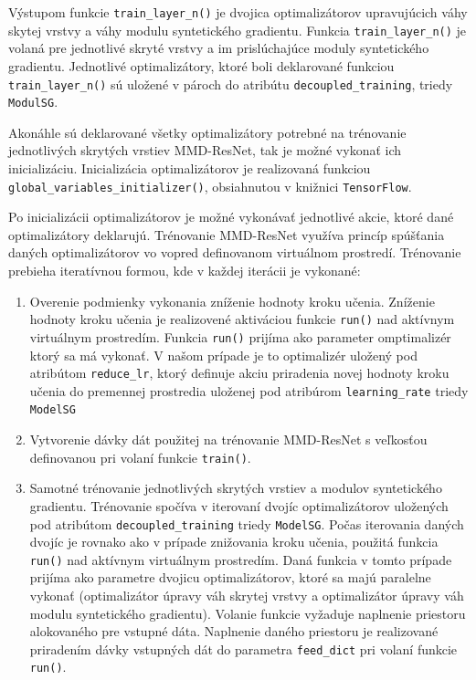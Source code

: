 Výstupom funkcie \texttt{train_layer_n()} je dvojica optimalizátorov upravujúcich váhy skytej vrstvy a váhy modulu syntetického gradientu. Funkcia \texttt{train_layer_n()} je volaná pre jednotlivé skryté vrstvy a im prislúchajúce moduly syntetického gradientu. Jednotlivé optimalizátory, ktoré boli deklarované funkciou \texttt{train_layer_n()} sú uložené v pároch do atribútu \texttt{decoupled_training}, triedy \texttt{ModulSG}. 

Akonáhle sú deklarované všetky optimalizátory potrebné na trénovanie jednotlivých skrytých vrstiev MMD-ResNet, tak je možné vykonať ich inicializáciu. Inicializácia optimalizátorov je realizovaná funkciou \texttt{global_variables_initializer()}, obsiahnutou v knižnici \texttt{TensorFlow}.

Po inicializácii optimalizátorov je možné vykonávať jednotlivé akcie, ktoré dané optimalizátory deklarujú. Trénovanie MMD-ResNet využíva princíp spúšťania daných optimalizátorov vo vopred definovanom virtuálnom prostredí. Trénovanie prebieha iteratívnou formou, kde v každej iterácii je vykonané:
\begin{enumerate}
    \item Overenie podmienky vykonania zníženie hodnoty kroku učenia. Zníženie hodnoty kroku učenia je realizovené aktiváciou funkcie \texttt{run()} nad aktívnym virtuálnym prostredím. Funkcia \texttt{run()} prijíma ako parameter omptimalizér ktorý sa má vykonať. V našom prípade je to optimalizér uložený pod atribútom \texttt{reduce_lr}, ktorý definuje akciu priradenia novej hodnoty kroku učenia do premennej prostredia uloženej pod atribúrom \texttt{learning_rate} triedy \texttt{ModelSG}
    \item Vytvorenie dávky dát použitej na trénovanie MMD-ResNet s veľkosťou definovanou pri volaní funkcie \texttt{train()}.
    \item Samotné trénovanie jednotlivých skrytých vrstiev a modulov syntetického gradientu. Trénovanie spočíva v iterovaní dvojíc optimalizátorov uložených pod atribútom \texttt{decoupled_training} triedy \texttt{ModelSG}. Počas iterovania daných dvojíc je rovnako ako v prípade znižovania kroku učenia, použitá funkcia \texttt{run()} nad aktívnym virtuálnym prostredím. Daná funkcia v tomto prípade prijíma ako parametre dvojicu optimalizátorov, ktoré sa majú paralelne vykonať (optimalizátor úpravy váh skrytej vrstvy a optimalizátor úpravy váh modulu syntetického gradientu). Volanie funkcie vyžaduje naplnenie priestoru alokovaného pre vstupné dáta. Naplnenie daného priestoru je realizované priradením dávky vstupných dát do parametra \texttt{feed_dict} pri volaní funkcie \texttt{run()}.
\end{enumerate}


